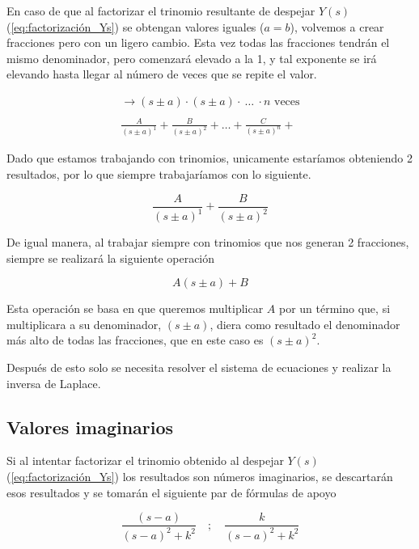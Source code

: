 En caso de que al factorizar el trinomio resultante de despejar $Y(s)$ (\autoref{eq:factorización_Ys}) se obtengan valores iguales ($a = b$), volvemos a crear fracciones pero con un ligero cambio. Esta vez todas las fracciones tendrán el mismo denominador, pero comenzará elevado a la 1, y tal exponente se irá elevando hasta llegar al número de veces que se repite el valor.

\begin{gather*}
    [\text{Polinomio}] \longrightarrow (s \pm a) \cdot (s \pm a) \cdot \ \ldots \ \cdot n \text{ veces}
    \\
    \\
    \frac{A}{(s \pm a)^{1}} + \frac{B}{(s \pm a)^{2}} + \ldots + \frac{C}{(s \pm a)^{n}} + 
\end{gather*}

Dado que estamos trabajando con trinomios, unicamente estaríamos obteniendo 2 resultados, por lo que siempre trabajaríamos con lo siguiente.

\begin{equation*}
    \frac{A}{(s \pm a)^{1}} + \frac{B}{(s \pm a)^{2}}
\end{equation*}

De igual manera, al trabajar siempre con trinomios que nos generan 2 fracciones, siempre se realizará la siguiente operación

\begin{equation*}
    A(s \pm a) + B
\end{equation*}

Esta operación se basa en que queremos multiplicar $A$ por un término que, si multiplicara a su denominador, $(s \pm a)$, diera como resultado el denominador más alto de todas las fracciones, que en este caso es $(s \pm a)^{2}$.

Después de esto solo se necesita resolver el sistema de ecuaciones y realizar la inversa de Laplace.

\subsection{Valores imaginarios}

Si al intentar factorizar el trinomio obtenido al despejar $Y(s)$ (\autoref{eq:factorización_Ys}) los resultados son números imaginarios, se descartarán esos resultados y se tomarán el siguiente par de fórmulas de apoyo

\begin{equation*}\label{eq:laplace_imaginarios}
    \frac{(s - a)}{(s-a)^{2}+k^{2}} \quad ; \quad \frac{k}{(s-a)^{2}+k^{2}} 
\end{equation*}

